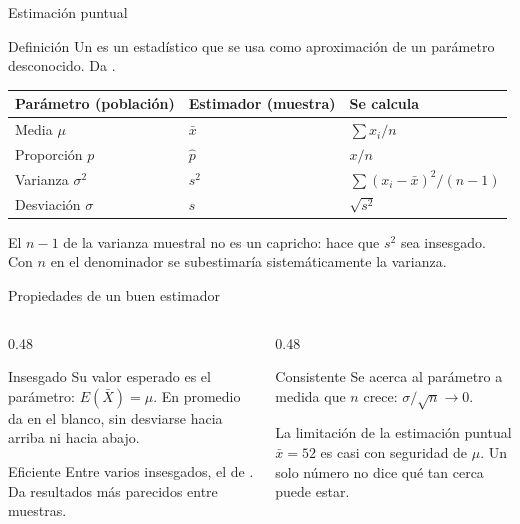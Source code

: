 \documentclass[aspectratio=169,10pt]{beamer}
\begin{document}
\begin{frame}{Estimación puntual}
  \begin{block}{Definición}
    \small
    Un  es un estadístico que se usa como aproximación
    de un parámetro desconocido. Da .
  \end{block}

  \vspace{0.2cm}
  \footnotesize
  \begin{center}
  \begin{tabular}{@{}lll@{}}
    \toprule
    \textbf{Parámetro (población)} & \textbf{Estimador (muestra)} &
    \textbf{Se calcula} \\
    \midrule
    Media $\mu$        & $\bar{x}$   & $\sum x_i/n$ \\
    Proporción $p$     & $\hat{p}$   & $x/n$ \\
    Varianza $\sigma^{2}$ & $s^{2}$  & $\sum(x_i-\bar x)^{2}/(n-1)$ \\
    Desviación $\sigma$ & $s$        & $\sqrt{s^{2}}$ \\
    \bottomrule
  \end{tabular}
  \end{center}

  \vspace{0.2cm}
  {\footnotesize\color{uniGris} El $n-1$ de la varianza muestral no es un
  capricho: hace que $s^{2}$ sea insesgado. Con $n$ en el denominador se
  subestimaría sistemáticamente la varianza.}
\end{frame}

\begin{frame}{Propiedades de un buen estimador}
  \begin{columns}[T,onlytextwidth]
    \begin{column}{0.48\textwidth}
      \begin{block}{Insesgado}
        \footnotesize
        Su valor esperado es el parámetro: $E(\bar X)=\mu$. En promedio da en
        el blanco, sin desviarse hacia arriba ni hacia abajo.
      \end{block}
      \begin{block}{Eficiente}
        \footnotesize
        Entre varios insesgados, el de . Da resultados más
        parecidos entre muestras.
      \end{block}
    \end{column}
    \begin{column}{0.48\textwidth}
      \begin{block}{Consistente}
        \footnotesize
        Se acerca al parámetro a medida que $n$ crece: $\sigma/\sqrt{n}\to 0$.
      \end{block}
      \begin{alertblock}{La limitación de la estimación puntual}
        \footnotesize
        $\bar{x}=52$ es casi con seguridad  de $\mu$. Un
        solo número no dice qué tan cerca puede estar. 
      \end{alertblock}
    \end{column}
  \end{columns}
\end{frame}
\end{document}
